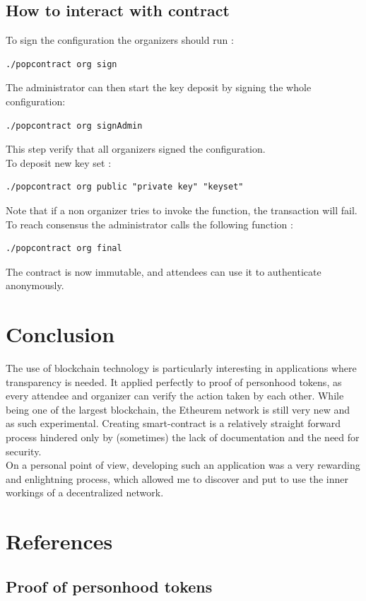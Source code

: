 \documentclass[11pt, a4paper, twoside, openright]{book} %
\begin{document}
\subsection{How to interact with contract}
To sign the configuration the organizers should run :
\begin{verbatim}
./popcontract org sign
\end{verbatim}
The administrator can then start the key deposit by signing the whole configuration:
\begin{verbatim}
./popcontract org signAdmin
\end{verbatim}
This step verify that all organizers signed the configuration. \\
To deposit new key set :
\begin{verbatim}
./popcontract org public "private key" "keyset"
\end{verbatim}
Note that if a non organizer tries to invoke the function, the transaction will fail.
To reach consensus the administrator calls the following function :
\begin{verbatim}
./popcontract org final
\end{verbatim}
The contract is now immutable, and attendees can use it to authenticate anonymously.
\section{Conclusion}
The use of blockchain technology is particularly interesting in applications where transparency is needed. It applied perfectly to proof of
personhood tokens, as every attendee and organizer can verify the action taken by each other. While being one of the largest blockchain, the Etheurem network is still very new and as such experimental. Creating smart-contract is a relatively straight forward process hindered only by
(sometimes) the lack of documentation and the need for security.\\
On a personal point of view, developing such an application was a very rewarding and enlightning process, which allowed me to discover and put to use the inner workings
of a decentralized network.
\newpage

\section*{References}
\subsection*{Proof of personhood tokens}
\end{document}
